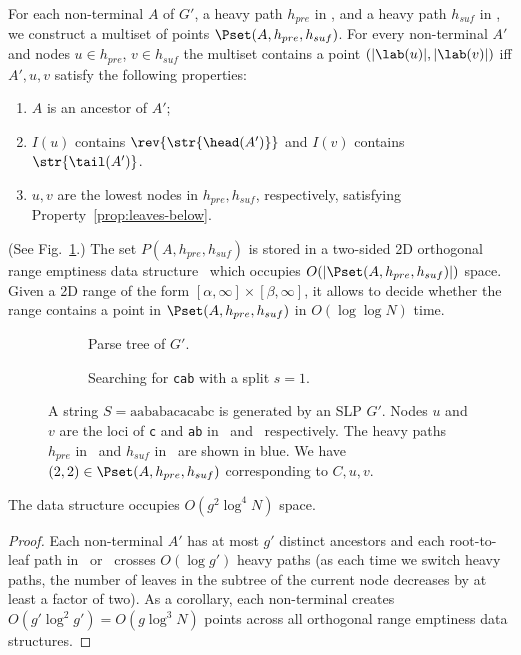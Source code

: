For each non-terminal $A$ of $G'$, a heavy path $h_{pre}$ in \Tpre, and a heavy path $h_{suf}$ in \Tsuf, we construct a multiset of points $\Pset(A,h_{pre},h_{suf})$. For every non-terminal $A'$ and nodes $u \in h_{pre}$, $v \in h_{suf}$ the multiset contains a point $(|\lab(u)|, |\lab(v)|)$ iff $A', u, v$ satisfy the following properties:
\begin{enumerate}
\item $A$ is an ancestor of $A'$;
\item  \label{prop:leaves-below} $I(u)$ contains $\rev{\str{\head(A')}} $ and $I(v)$ contains $\str{\tail(A')} $. 
\item $u,v$ are the lowest nodes in $h_{pre}, h_{suf}$, respectively, satisfying Property~\ref{prop:leaves-below}.
\end{enumerate}
(See Fig.~\ref{fig:occurrences}.) The set 
$P(A,h_{pre},h_{suf})$ is stored in a two-sided 2D orthogonal range emptiness data structure~\cite{Lewenstein13,journals/talg/Chan13} which occupies  $O(|\Pset(A,h_{pre},h_{suf})|)$ space. 
 Given a 2D range of the form $[\alpha,\infty]\times[\beta,\infty]$, it allows to decide whether the range contains a point in $\Pset(A,h_{pre},h_{suf})$ in $O(\log\log N)$ time.
 

\begin{figure}
\centering
\captionsetup[subfigure]{justification=centering}
\begin{subfigure}[b]{0.4\textwidth}
\centering
\caption{Parse tree of $G'$.}
\end{subfigure}
\hfill
\begin{subfigure}[b]{0.58\textwidth}
\centering
\caption{Searching for \texttt{cab} with a split $s=1$.}
\end{subfigure}
\caption{A string $S=\mathrm{aababacacabc}$ is generated by an SLP $G'$. Nodes $u$ and $v$ are the loci of \texttt{c} and \texttt{ab} in \Tpre\  and \Tsuf\, respectively. The heavy paths $h_{pre}$ in \Tpre\ and $h_{suf}$ in \Tsuf\ are shown in blue. We have $(2,2) \in \Pset(A,h_{pre},h_{suf})$ corresponding to $C,u,v$.}
\label{fig:occurrences}
\end{figure}

\begin{claim}\label{claim:space-all}
The data structure occupies $O(g^2 \log^4 N)$ space.
\end{claim}
\begin{proof}
Each non-terminal $A'$ has at most $g'$ distinct ancestors and each root-to-leaf path in \Tpre\ or \Tsuf\ crosses $O(\log g')$ heavy paths (as each time we switch heavy paths, the number of leaves in the subtree of the current node decreases by at least a factor of two). As a corollary, each non-terminal creates $O(g' \log^2 g') = O(g \log^3 N)$ points across all orthogonal range emptiness data structures. 
\end{proof}


